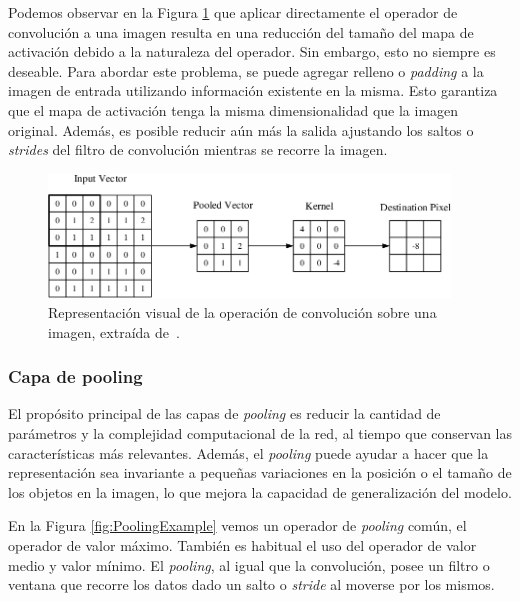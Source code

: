 Podemos observar en la Figura \ref{fig:ConvolutionalRepresentation} que aplicar directamente 
el operador de convolución a una imagen resulta en una reducción del tamaño del mapa 
de activación debido a la naturaleza del operador. 
Sin embargo, esto no siempre es deseable. 
Para abordar este problema, se puede agregar relleno o \emph{padding} a la imagen 
de entrada utilizando información existente en la misma. 
Esto garantiza que el mapa de activación tenga la misma dimensionalidad que 
la imagen original. Además, es posible reducir aún más la salida ajustando 
los saltos o \emph{strides} del filtro de convolución mientras se recorre la imagen.

\begin{figure}[htp]
  \begin{center}
    \includegraphics[width=0.95\textwidth]{imagenes/chapter2/ConvolutionalRepresentation.png}
  \end{center}
  \caption[Representación visual de la operación de convolución.]{Representación visual de la operación de convolución sobre una imagen, extraída de~\cite{ConvolutionalRepresentation}.
  }
  \label{fig:ConvolutionalRepresentation}
\end{figure}

\subsubsection{Capa de pooling} 
El propósito principal de las capas de \emph{pooling} es reducir la cantidad de parámetros 
y la complejidad computacional de la red, al tiempo que conservan las características 
más relevantes. Además, el \emph{pooling} puede ayudar a hacer que la representación sea 
invariante a pequeñas variaciones en la posición o el tamaño de los objetos en la 
imagen, lo que mejora la capacidad de generalización del modelo.

En la Figura \ref{fig:PoolingExample} vemos un operador de \emph{pooling} común,
el operador de valor máximo. También es habitual el uso del operador de valor medio y
valor mínimo.
El \emph{pooling}, al igual que la convolución, posee un filtro o ventana que recorre
los datos dado un salto o \emph{stride} al moverse por los mismos.

